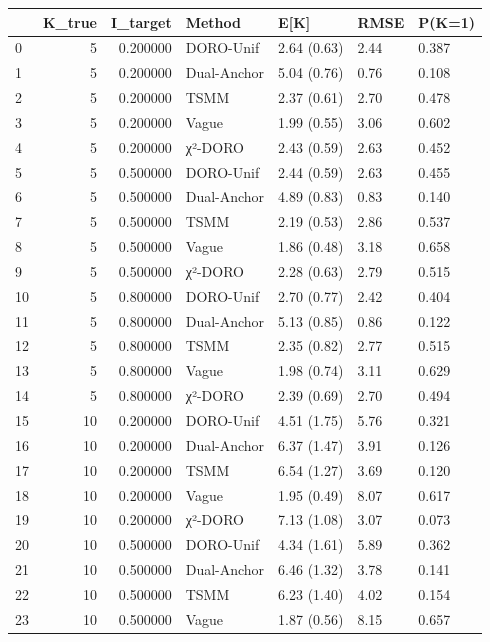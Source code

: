 \begin{tabular}{lrrllll}
\toprule
 & K_true & I_target & Method & E[K] & RMSE & P(K=1) \\
\midrule
0 & 5 & 0.200000 & DORO-Unif & 2.64 (0.63) & 2.44 & 0.387 \\
1 & 5 & 0.200000 & Dual-Anchor & 5.04 (0.76) & 0.76 & 0.108 \\
2 & 5 & 0.200000 & TSMM & 2.37 (0.61) & 2.70 & 0.478 \\
3 & 5 & 0.200000 & Vague & 1.99 (0.55) & 3.06 & 0.602 \\
4 & 5 & 0.200000 & χ²-DORO & 2.43 (0.59) & 2.63 & 0.452 \\
5 & 5 & 0.500000 & DORO-Unif & 2.44 (0.59) & 2.63 & 0.455 \\
6 & 5 & 0.500000 & Dual-Anchor & 4.89 (0.83) & 0.83 & 0.140 \\
7 & 5 & 0.500000 & TSMM & 2.19 (0.53) & 2.86 & 0.537 \\
8 & 5 & 0.500000 & Vague & 1.86 (0.48) & 3.18 & 0.658 \\
9 & 5 & 0.500000 & χ²-DORO & 2.28 (0.63) & 2.79 & 0.515 \\
10 & 5 & 0.800000 & DORO-Unif & 2.70 (0.77) & 2.42 & 0.404 \\
11 & 5 & 0.800000 & Dual-Anchor & 5.13 (0.85) & 0.86 & 0.122 \\
12 & 5 & 0.800000 & TSMM & 2.35 (0.82) & 2.77 & 0.515 \\
13 & 5 & 0.800000 & Vague & 1.98 (0.74) & 3.11 & 0.629 \\
14 & 5 & 0.800000 & χ²-DORO & 2.39 (0.69) & 2.70 & 0.494 \\
15 & 10 & 0.200000 & DORO-Unif & 4.51 (1.75) & 5.76 & 0.321 \\
16 & 10 & 0.200000 & Dual-Anchor & 6.37 (1.47) & 3.91 & 0.126 \\
17 & 10 & 0.200000 & TSMM & 6.54 (1.27) & 3.69 & 0.120 \\
18 & 10 & 0.200000 & Vague & 1.95 (0.49) & 8.07 & 0.617 \\
19 & 10 & 0.200000 & χ²-DORO & 7.13 (1.08) & 3.07 & 0.073 \\
20 & 10 & 0.500000 & DORO-Unif & 4.34 (1.61) & 5.89 & 0.362 \\
21 & 10 & 0.500000 & Dual-Anchor & 6.46 (1.32) & 3.78 & 0.141 \\
22 & 10 & 0.500000 & TSMM & 6.23 (1.40) & 4.02 & 0.154 \\
23 & 10 & 0.500000 & Vague & 1.87 (0.56) & 8.15 & 0.657 \\

\end{tabular}
